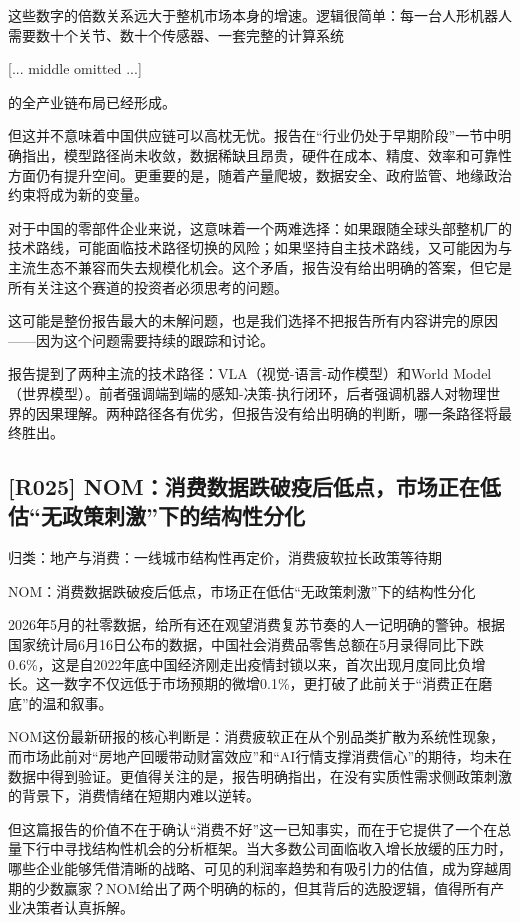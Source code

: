\documentclass[11pt]{ctexart}
\begin{document}
这些数字的倍数关系远大于整机市场本身的增速。逻辑很简单：每一台人形机器人需要数十个关节、数十个传感器、一套完整的计算系统

[... middle omitted ...]

的全产业链布局已经形成。

但这并不意味着中国供应链可以高枕无忧。报告在“行业仍处于早期阶段”一节中明确指出，模型路径尚未收敛，数据稀缺且昂贵，硬件在成本、精度、效率和可靠性方面仍有提升空间。更重要的是，随着产量爬坡，数据安全、政府监管、地缘政治约束将成为新的变量。

对于中国的零部件企业来说，这意味着一个两难选择：如果跟随全球头部整机厂的技术路线，可能面临技术路径切换的风险；如果坚持自主技术路线，又可能因为与主流生态不兼容而失去规模化机会。这个矛盾，报告没有给出明确的答案，但它是所有关注这个赛道的投资者必须思考的问题。

这可能是整份报告最大的未解问题，也是我们选择不把报告所有内容讲完的原因——因为这个问题需要持续的跟踪和讨论。

报告提到了两种主流的技术路径：VLA（视觉-语言-动作模型）和World Model（世界模型）。前者强调端到端的感知-决策-执行闭环，后者强调机器人对物理世界的因果理解。两种路径各有优劣，但报告没有给出明确的判断，哪一条路径将最终胜出。

\subsection{[R025] NOM：消费数据跌破疫后低点，市场正在低估“无政策刺激”下的结构性分化}
{\small\color{refgray}归类：地产与消费：一线城市结构性再定价，消费疲软拉长政策等待期}

NOM：消费数据跌破疫后低点，市场正在低估“无政策刺激”下的结构性分化

2026年5月的社零数据，给所有还在观望消费复苏节奏的人一记明确的警钟。根据国家统计局6月16日公布的数据，中国社会消费品零售总额在5月录得同比下跌0.6\%，这是自2022年底中国经济刚走出疫情封锁以来，首次出现月度同比负增长。这一数字不仅远低于市场预期的微增0.1\%，更打破了此前关于“消费正在磨底”的温和叙事。

NOM这份最新研报的核心判断是：消费疲软正在从个别品类扩散为系统性现象，而市场此前对“房地产回暖带动财富效应”和“AI行情支撑消费信心”的期待，均未在数据中得到验证。更值得关注的是，报告明确指出，在没有实质性需求侧政策刺激的背景下，消费情绪在短期内难以逆转。

但这篇报告的价值不在于确认“消费不好”这一已知事实，而在于它提供了一个在总量下行中寻找结构性机会的分析框架。当大多数公司面临收入增长放缓的压力时，哪些企业能够凭借清晰的战略、可见的利润率趋势和有吸引力的估值，成为穿越周期的少数赢家？NOM给出了两个明确的标的，但其背后的选股逻辑，值得所有产业决策者认真拆解。
\end{document}
